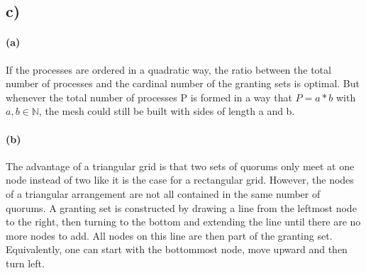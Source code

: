 \documentclass[12pt,a4paper]{article}
\begin{document}
  \subsection*{c)} %
    \paragraph*{(a)} 
    If the processes are ordered in a quadratic way, the ratio between the total number of processes and the cardinal number of the granting sets is optimal. But whenever the total number of processes P is formed in a way that $P=a*b$ with $a,b \in \mathbb{N}$, the mesh could still be built with sides of length a and b.
    \paragraph*{(b)} %
	The advantage of a triangular grid is that two sets of quorums only meet at one node instead of two like it is the case for a rectangular grid. However, the nodes of a triangular arrangement are not all contained in the same number of quorums.
	A granting set is constructed by drawing a line from the leftmost node to the right, then turning to the bottom and extending the line until there are no more nodes to add. All nodes on this line are then part of the granting set. Equivalently, one can start with the bottommost node, move upward and then turn left.
\end{document}
